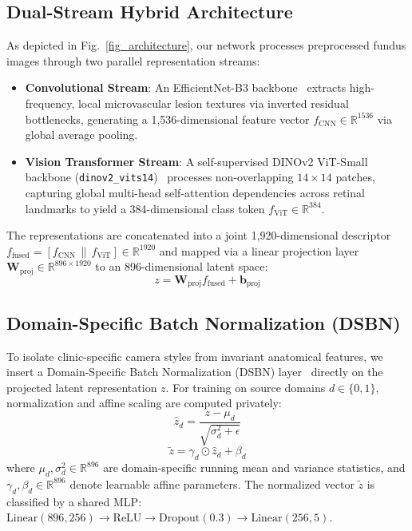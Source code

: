 \documentclass[conference]{IEEEtran}
\begin{document}
\subsection{Dual-Stream Hybrid Architecture}
As depicted in Fig.~\ref{fig_architecture}, our network processes preprocessed fundus images through two parallel representation streams:
\begin{itemize}
    \item \textbf{Convolutional Stream}: An EfficientNet-B3 backbone~\cite{tan2019efficientnet} extracts high-frequency, local microvascular lesion textures via inverted residual bottlenecks, generating a 1,536-dimensional feature vector $f_{\text{CNN}} \in \mathbb{R}^{1536}$ via global average pooling.
    \item \textbf{Vision Transformer Stream}: A self-supervised DINOv2 ViT-Small backbone (\texttt{dinov2\_vits14})~\cite{oquab2023dinov2} processes non-overlapping $14 \times 14$ patches, capturing global multi-head self-attention dependencies across retinal landmarks to yield a 384-dimensional class token $f_{\text{ViT}} \in \mathbb{R}^{384}$.
\end{itemize}
The representations are concatenated into a joint 1,920-dimensional descriptor $f_{\text{fused}} = [f_{\text{CNN}} \,\|\, f_{\text{ViT}}] \in \mathbb{R}^{1920}$ and mapped via a linear projection layer $\mathbf{W}_{\text{proj}} \in \mathbb{R}^{896 \times 1920}$ to an 896-dimensional latent space:
\begin{equation}
z = \mathbf{W}_{\text{proj}} f_{\text{fused}} + \mathbf{b}_{\text{proj}}
\end{equation}

\subsection{Domain-Specific Batch Normalization (DSBN)}
To isolate clinic-specific camera styles from invariant anatomical features, we insert a Domain-Specific Batch Normalization (DSBN) layer~\cite{chang2019domain} directly on the projected latent representation $z$. For training on source domains $d \in \{0, 1\}$, normalization and affine scaling are computed privately:
\begin{equation}
\hat{z}_d = \frac{z - \mu_d}{\sqrt{\sigma_d^2 + \epsilon}}
\label{eq:dsbn_norm}
\end{equation}
\begin{equation}
\tilde{z} = \gamma_d \odot \hat{z}_d + \beta_d
\label{eq:dsbn_affine}
\end{equation}
where $\mu_d, \sigma_d^2 \in \mathbb{R}^{896}$ are domain-specific running mean and variance statistics, and $\gamma_d, \beta_d \in \mathbb{R}^{896}$ denote learnable affine parameters. The normalized vector $\tilde{z}$ is classified by a shared MLP: $\text{Linear}(896, 256) \rightarrow \text{ReLU} \rightarrow \text{Dropout}(0.3) \rightarrow \text{Linear}(256, 5)$.
\end{document}
